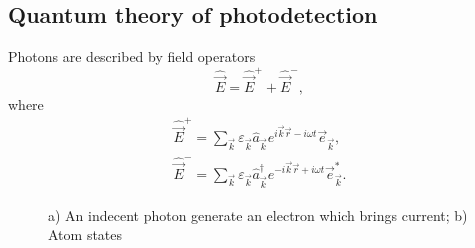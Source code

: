 \subsection{Quantum theory of photodetection}

Photons are described by field operators
\begin{equation}
	\hat{\vec{E}} = \hat{\vec{E}}^+ + \hat{\vec{E}}^-,
\end{equation}
where
\begin{eqnarray}
	\hat{\vec{E}}^+ = \sum_{\vec{k}} \varepsilon_{\vec{k}} \hat{a}_{\vec{k}} e^{i \vec{k} \vec{r} - i \omega t} \vec{e}_{\vec{k}}, \\
	\hat{\vec{E}}^- = \sum_{\vec{k}} \varepsilon_{\vec{k}} \hat{a}^{\dagger}_{\vec{k}} e^{-i \vec{k} \vec{r} + i \omega t} \vec{e}^*_{\vec{k}}.
\end{eqnarray}

\begin{figure}[h!]
	\begin{minipage}[h]{0.49\linewidth}
	\end{minipage}
	\hfill
	\begin{minipage}[h]{0.49\linewidth}
	\end{minipage}
	\caption{a) An indecent photon generate an electron which brings current; b) Atom states}
	\label{fig:dec}
\end{figure}


